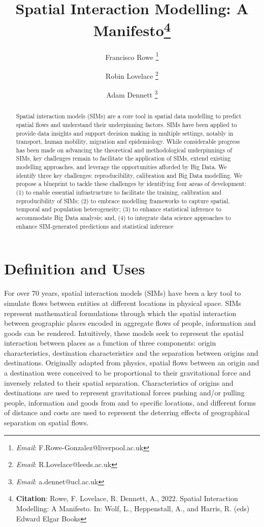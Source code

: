 \documentclass[11pt,letterpaper]{article}
\title{Spatial Interaction Modelling: A Manifesto\footnote{\textbf{Citation}: Rowe, F. Lovelace, R. Dennett, A., 2022. Spatial Interaction Modelling: A Manifesto. In: Wolf, L., Heppenstall, A., and Harris, R. (eds) Edward Elgar Books}}
\author[1]{Francisco Rowe \thanks{\textit{Email}: F.Rowe-Gonzalez@liverpool.ac.uk}}
\affil[1]{Geographic Data Science Lab, Department of Geography and Planning, University of Liverpool, Liverpool, United Kingdom}
\author[2]{Robin Lovelace \thanks{\textit{Email}: R.Lovelace@leeds.ac.uk}}
\affil[2]{Institute for Transport Studies, University of Leeds, Leeds, United Kingdom}
\author[3]{Adam Dennett \thanks{\textit{Email}: a.dennet@ucl.ac.uk}}
\affil[3]{The Bartlett Centre for Advanced Spatial Analytics, University College London, London, United Kingdom}
\date{}
\begin{document}
\maketitle



\begin{abstract}

Spatial interaction models (SIMs) are a core tool in spatial data modelling to predict spatial flows and understand their underpinning factors. 
SIMs have been applied to provide data insights and support decision making in multiple settings, notably in transport, human mobility, migration and epidemiology. 
While considerable progress has been made on advancing the theoretical and methodological underpinnings of SIMs, key challenges remain to facilitate the application of SIMs, extend existing modelling approaches, and leverage the opportunities afforded by Big Data.
We identify three key challenges: reproducibility, calibration and Big Data modelling. 
We propose a blueprint to tackle these challenges by identifying four areas of development: 
(1) to enable essential infrastructure to facilitate the training, calibration and reproducibility of SIMs; 
(2) to embrace modelling frameworks to capture spatial, temporal and population heterogeneity; 
(3) to enhance statistical inference to accommodate Big Data analysis; and, 
(4) to integrate data science approaches to enhance SIM-generated predictions and statistical inference

\end{abstract}



\pagebreak

\hypertarget{definition-and-uses}{%
\section{Definition and Uses}\label{definition-and-uses}}

For over 70 years, spatial interaction models (SIMs) have been a key tool to simulate flows between entities at different locations in physical space.
SIMs represent mathematical formulations through which the spatial interaction between geographic places encoded in aggregate flows of people, information and goods can be rendered.
Intuitively, these models seek to represent the spatial interaction between places as a function of three components: origin characteristics, destination characteristics and the separation between origins and destinations.
Originally adapted from physics, spatial flows between an origin and a destination were conceived to be proportional to their gravitational force and inversely related to their spatial separation.
Characteristics of origins and destinations are used to represent gravitational forces pushing and/or pulling people, information and goods from and to specific locations, and different forms of distance and costs are used to represent the deterring effects of geographical separation on spatial flows.
\end{document}
